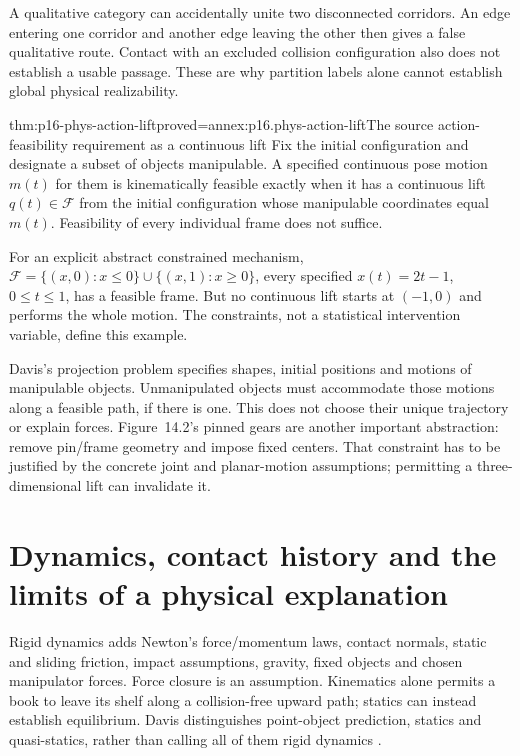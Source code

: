 A qualitative category can accidentally unite two disconnected corridors.
An edge entering one corridor and another edge leaving the other then gives
a false qualitative route. Contact with an excluded collision configuration
also does not establish a usable passage. These are why partition labels
alone cannot establish global physical realizability.

\begin{hbtheorem}{thm:p16-phys-action-lift}{proved=annex:p16.phys-action-lift}{The source action-feasibility requirement as a continuous lift}
Fix the initial configuration and designate a subset of objects manipulable.
A specified continuous pose motion \(m(t)\) for them is kinematically
feasible exactly when it has a continuous lift \(q(t)\in\mathcal F\)
from the initial configuration whose manipulable coordinates equal \(m(t)\).
Feasibility of every individual frame does not suffice.

For an explicit abstract constrained mechanism,
\(\mathcal F=\{(x,0):x\le0\}\cup\{(x,1):x\ge0\}\), every
specified \(x(t)=2t-1\), \(0\le t\le1\), has a feasible frame.
But no continuous lift starts at \((-1,0)\) and performs the whole motion.
The constraints, not a statistical intervention variable, define this example.
\end{hbtheorem}

Davis's projection problem specifies shapes, initial positions and motions
of manipulable objects. Unmanipulated objects must accommodate those motions
along a feasible path, if there is one. This does not choose their unique
trajectory or explain forces. Figure~14.2's pinned gears are another
important abstraction: remove pin/frame geometry and impose fixed centers.
That constraint has to be justified by the concrete joint and planar-motion
assumptions; permitting a three-dimensional lift can invalidate it.

\section{Dynamics, contact history and the limits of a physical explanation}
\label{sec:p16-phys-dynamics}

Rigid dynamics adds Newton's force/momentum laws, contact normals, static
and sliding friction, impact assumptions, gravity, fixed objects and chosen
manipulator forces. Force closure is an assumption. Kinematics alone permits
a book to leave its shelf along a collision-free upward path; statics can
instead establish equilibrium. Davis distinguishes point-object prediction,
statics and quasi-statics, rather than calling all of them rigid dynamics
\cite[pp.~605--608]{Davis2008PhysicalReasoning}.

